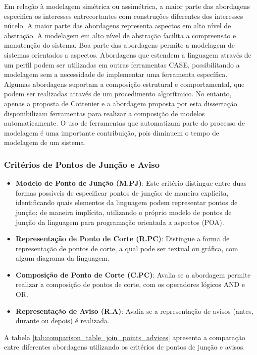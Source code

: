 Em relação à modelagem simétrica ou assimétrica, a maior parte das abordagens especifica os interesses entrecortantes com construções diferentes dos
interesses núcelo. A maior parte das abordagens representa aspectos em alto nível de abstração. A modelagem em alto nível de abstração facilita a
compreensão e manutenção do sistema. Boa parte das abordagens permite a modelagem de sistemas orientados a aspectos. Abordagens que estendem a
linguagem através de um perfil podem ser utilizadas em outras ferramentas CASE, possibilitando a modelagem sem a necessidade de implementar uma
ferramenta específica. Algumas abordagens suportam a composição estrutural e comportamental, que podem ser realizadas através de um procedimento
algorítmico. No entanto, apenas a proposta de Cottenier e a abordagem proposta por esta dissertação disponibilizam ferramentas para realizar 
a composição de modelos automaticamente. O uso de ferramentas que automatizam parte do processo de modelagem é uma importante contribuição, pois
diminuem o tempo de modelagem de um sistema.

\subsubsection{Critérios de Pontos de Junção e Aviso}

\begin{itemize}
	\item \textbf{Modelo de Ponto de Junção (M.PJ)}: Este critério distingue entre duas formas possíveis de especificar pontos de junção: de maneira
	explícita, identificando quais elementos da linguagem podem representar pontos de junção; de maneira implícita, utilizando o próprio modelo de pontos de junção
	da linguagem para programação orientada a aspectos (POA).
	\item \textbf{Representação de Ponto de Corte (R.PC)}: Distingue a forma de representação de pontos de corte, a qual pode ser textual ou gráfica,
	com algum diagrama da linguagem. 
	\item \textbf{Composição de Ponto de Corte (C.PC)}: Avalia se a abordagem permite realizar a composição de pontos de corte, com os operadores
	lógicos AND e OR. 
	\item \textbf{Representação de Aviso (R.A)}: Avalia se a representação de avisos (antes, durante ou depois) é realizada.
\end{itemize}

A tabela \ref{tab:comparison_table_join_points_advices} apresenta a comparação entre diferentes abordagens utilizando os critérios de pontos de
junção e avisos.


